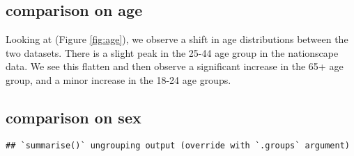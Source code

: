 \documentclass[
]{article}
\newenvironment{Shaded}{\begin{snugshade}}{\end{snugshade}}
\newcommand{\DataTypeTok}[1]{\textcolor[rgb]{0.13,0.29,0.53}{#1}}
\newcommand{\DecValTok}[1]{\textcolor[rgb]{0.00,0.00,0.81}{#1}}
\newcommand{\KeywordTok}[1]{\textcolor[rgb]{0.13,0.29,0.53}{\textbf{#1}}}
\newcommand{\NormalTok}[1]{#1}
\newcommand{\OperatorTok}[1]{\textcolor[rgb]{0.81,0.36,0.00}{\textbf{#1}}}
\newcommand{\StringTok}[1]{\textcolor[rgb]{0.31,0.60,0.02}{#1}}
\begin{document}
\hypertarget{comparison-on-age}{%
\subsection{comparison on age}\label{comparison-on-age}}

Looking at (Figure \ref{fig:age}), we observe a shift in age distributions between the two datasets. There is a slight peak in the 25-44 age group in the nationscape data. We see this flatten and then observe a significant increase in the 65+ age group, and a minor increase in the 18-24 age groups.

\hypertarget{comparison-on-sex}{%
\subsection{comparison on sex}\label{comparison-on-sex}}

\begin{Shaded}
\end{Shaded}

\begin{verbatim}
## `summarise()` ungrouping output (override with `.groups` argument)
\end{verbatim}

\begin{Shaded}
\end{Shaded}
\end{document}
